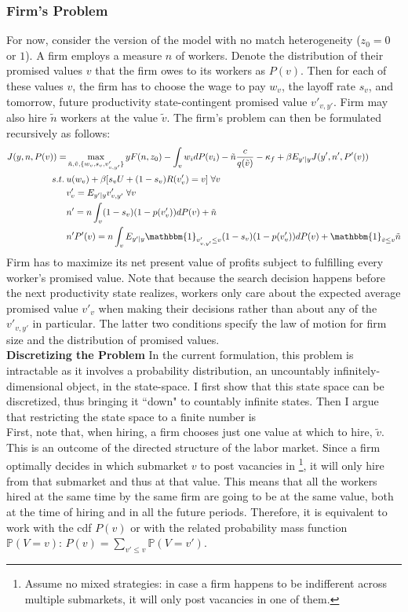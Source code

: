 \subsubsection*{Firm's Problem}
For now, consider the version of the model with no match heterogeneity ($z_0=0$ or $1$). A firm employs a measure $n$ of workers. Denote the distribution of their promised values $v$ that the firm owes to its workers as $P(v)$. Then for each of these values $v$, the firm has to choose the wage to pay $w_v$, the layoff rate $s_v$, and tomorrow, future productivity state-contingent promised value $v'_{v,y'}$. Firm may also hire $\tilde{n}$ workers at the value $\tilde{v}$.
The firm's problem can then be formulated recursively as follows:
\begin{equation*}
    \begin{split}
    J(y,n,P(v)) = & \max_{\tilde{n},\tilde{v},\{w_v,s_v,v'_{v,y'}\}} yF(n,z_0) - \int_v w_i dP(v_i) -\tilde{n}\frac{c}{q(\tilde{v})} -\kappa_f+ \beta E_{y'|y} J(y',n',P'(v)) \\
     s.t. \: & u(w_v) + \beta [s_v U + (1-s_v)R(v'_{v})=v] \; \forall v \\
    & v'_v = E_{y'|y} v'_{v,y'} \; \forall v \\
    & n' = n\int_v (1-s_v)(1-p(v'_v))dP(v)+\tilde{n} \\
    & n'P'(v) = n\int_v E_{y'|y}\mathbbm{1}_{v'_{v,y'}\leq v} (1-s_v)(1-p(v'_v))dP(v)+\mathbbm{1}_{\tilde{v}\leq v}\tilde{n}
    \end{split}
\end{equation*}
Firm has to maximize its net present value of profits subject to fulfilling every worker's promised value. 
Note that because the search decision happens before the next productivity state realizes, workers only care about the expected average promised value $v'_v$ when making their decisions rather than about any of the $v'_{v,y'}$ in particular. The latter two conditions specify the law of motion for firm size and the distribution of promised values. \\
\textbf{Discretizing the Problem} \label{subsection:discrete} In the current formulation, this problem is intractable as it involves a probability distribution, an uncountably infinitely-dimensional object, in the state-space. I first show that this state space can be discretized, thus bringing it ``down" to countably infinite states. Then I argue that restricting the state space to a finite number is \\
First, note that, when hiring, a firm chooses just one value at which to hire, $\tilde{v}$. This is an outcome of the directed structure of the labor market. Since a firm optimally decides in which submarket $v$ to post vacancies in \footnote{Assume no mixed strategies: in case a firm happens to be indifferent across multiple submarkets, it will only post vacancies in one of them.}, it will only hire from that submarket and thus at that value. This means that all the workers hired at the same time by the same firm are going to be at the same value, both at the time of hiring and in all the future periods. Therefore, it is equivalent to work with the cdf $P(v)$ or with the related probability mass function $\mathbb{P}(V=v)$: $P(v)=\sum_{v'\leq v}\mathbb{P}(V=v')$. 
